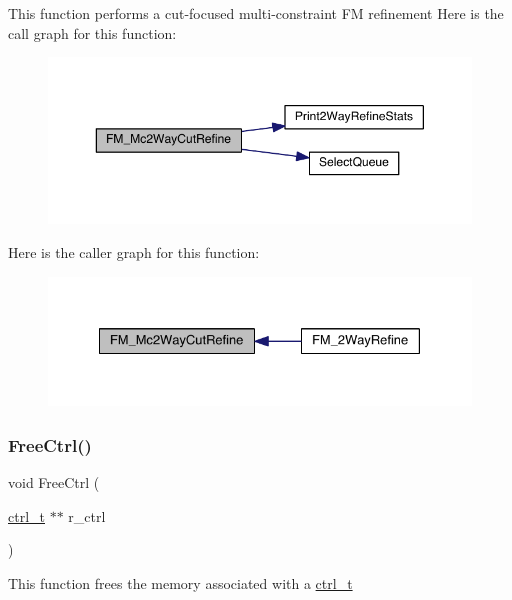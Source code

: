 This function performs a cut-\/focused multi-\/constraint FM refinement Here is the call graph for this function\+:\nopagebreak
\begin{figure}[H]
\begin{center}
\leavevmode
\includegraphics[width=350pt]{a00945_aaa49d065f964af00512da0c4b3d4cad6_cgraph}
\end{center}
\end{figure}
Here is the caller graph for this function\+:\nopagebreak
\begin{figure}[H]
\begin{center}
\leavevmode
\includegraphics[width=328pt]{a00945_aaa49d065f964af00512da0c4b3d4cad6_icgraph}
\end{center}
\end{figure}
\mbox{\label{a00945_ab44b3384fa925eae532b7bcc825159d7}} 
\subsubsection{\texorpdfstring{Free\+Ctrl()}{FreeCtrl()}}
{\footnotesize\ttfamily void Free\+Ctrl (\begin{DoxyParamCaption}\item[{\hyperlink{a00742}{ctrl\+\_\+t} $\ast$$\ast$}]{r\+\_\+ctrl }\end{DoxyParamCaption})}

This function frees the memory associated with a \hyperlink{a00742}{ctrl\+\_\+t} \mbox{\label{a00945_a0b364b3d4f25b8dae8722764639a0e8b}} 
